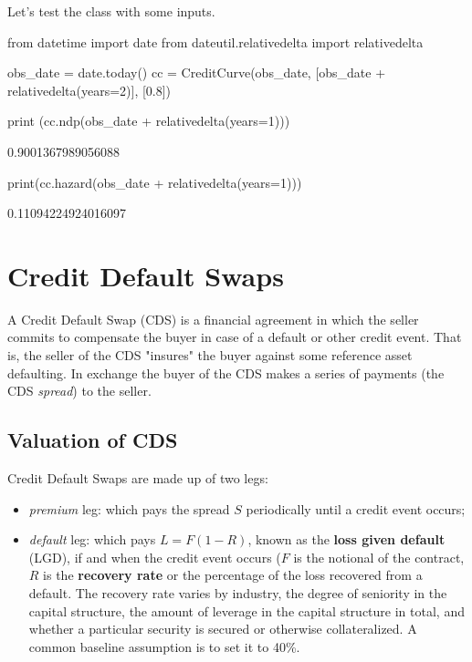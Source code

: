 Let's test the class with some inputs.
\begin{ipython}
from datetime import date
from dateutil.relativedelta import relativedelta
	
obs_date = date.today()
cc = CreditCurve(obs_date, [obs_date + relativedelta(years=2)], [0.8])
	
print (cc.ndp(obs_date + relativedelta(years=1)))
\end{ipython}
\begin{ioutput}
0.9001367989056088
\end{ioutput}
\begin{ipython}
print(cc.hazard(obs_date + relativedelta(years=1)))
\end{ipython}
\begin{ioutput}
0.11094224924016097
\end{ioutput}

\section{Credit Default Swaps}
\label{sec:credit-default-swaps}


A Credit Default Swap (CDS) is a financial agreement in which the seller commits to compensate the buyer in case of a default or other credit event. That is, the seller of the CDS "insures" the buyer against some reference asset defaulting. In exchange the buyer of the CDS makes a series of payments (the CDS \emph{spread}) to the seller.

\subsection{Valuation of CDS}
\label{sec:cds_valuation}

Credit Default Swaps are made up of two legs:

\begin{itemize}
\tightlist
\item \emph{premium} leg: which pays the spread $S$ periodically until a credit event occurs;
\item \emph{default} leg: which pays $L = F(1 - R)$, known as the \textbf{loss given default} (LGD), if and when the credit event occurs ($F$ is the notional of the contract, $R$ is the \textbf{recovery rate} or the percentage of the loss recovered from a default. The recovery rate varies by industry, the degree of seniority in the capital structure, the amount of leverage in the capital structure in total, and whether a particular security is secured or otherwise collateralized. A common baseline assumption is to set it to 40\%.
\end{itemize}

